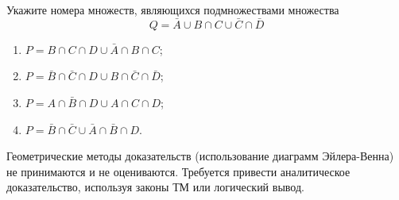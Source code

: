 \question
Укажите номера множеств, являющихся подмножествами множества
\begin{equation*}
	Q = \bar{A} \cup B \cap C \cup \bar{C} \cap \bar{D}
\end{equation*}

\begin{enumerate}
	\renewcommand{\labelenumi}{\arabic{enumi})}
	\item $P = B \cap C \cap D \cup \bar{A} \cap B \cap C$;
	\item $P = \bar{B} \cap \bar{C} \cap D \cup B \cap \bar{C} \cap \bar{D}$;
	\item $P = A \cap \bar{B} \cap D \cup A \cap C \cap D$;
	\item $P = \bar{B} \cap \bar{C} \cup \bar{A} \cap \bar{B} \cap D$.
\end{enumerate}

Геометрические методы доказательств (использование диаграмм Эйлера-Венна) не принимаются и не оцениваются. Требуется привести аналитическое доказательство, используя законы ТМ или логический вывод.
